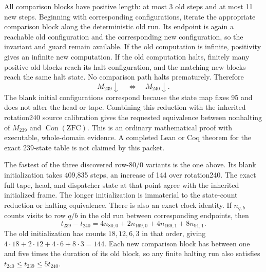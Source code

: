 All comparison blocks have positive length: at most 3 old steps and at
most 11 new steps.  Beginning with corresponding configurations, iterate
the appropriate comparison block along the deterministic old run.  Its
endpoint is again a reachable old configuration and the corresponding
new configuration, so the invariant and guard remain available.  If the
old computation is infinite, positivity gives an infinite new computation.
If the old computation halts, finitely many positive old blocks reach its
halt configuration, and the matching new blocks reach the same halt state.
No comparison path halts prematurely.  Therefore
\[
M_{239}\downarrow\quad\Longleftrightarrow\quad M_{240}\downarrow.
\]
The blank initial configurations correspond because the state map fixes
95 and does not alter the head or tape.  Combining this reduction with the
inherited rotation240 source calibration gives the requested equivalence
between nonhalting of $M_{239}$ and $\operatorname{Con}(\mathrm{ZFC})$.
This is an ordinary mathematical proof with executable, whole-domain
evidence.  A completed Lean or Coq theorem for the exact 239-state table
is not claimed by this packet.

The fastest of the three discovered row-$80/0$ variants is the one above.
Its blank initialization takes 409,835 steps, an increase of 144 over
rotation240.  The exact full tape, head, and dispatcher state at that
point agree with the inherited initialized frame.  The longer initialization
is immaterial to the state-count reduction or halting equivalence.
There is also an exact clock identity.  If $n_{q,b}$ counts visits to row
$q/b$ in the old run between corresponding endpoints, then
\[
t_{239}-t_{240}
=4n_{80,0}+2n_{169,0}+4n_{169,1}+8n_{91,1}.
\]
The old initialization has counts $18,12,6,3$ in that order, giving
$4\cdot18+2\cdot12+4\cdot6+8\cdot3=144$.  Each new comparison block has
between one and five times the duration of its old block, so any finite
halting run also satisfies $t_{240}\leq t_{239}\leq5t_{240}$.
